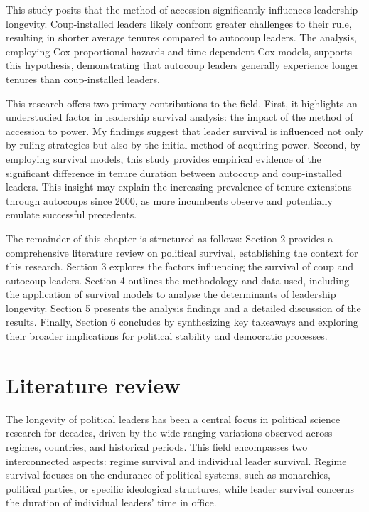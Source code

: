 \documentclass[
  12pt,
]{report}
\begin{document}
This study posits that the method of accession significantly influences
leadership longevity. Coup-installed leaders likely confront greater
challenges to their rule, resulting in shorter average tenures compared
to autocoup leaders. The analysis, employing Cox proportional hazards
and time-dependent Cox models, supports this hypothesis, demonstrating
that autocoup leaders generally experience longer tenures than
coup-installed leaders.

This research offers two primary contributions to the field. First, it
highlights an understudied factor in leadership survival analysis: the
impact of the method of accession to power. My findings suggest that
leader survival is influenced not only by ruling strategies but also by
the initial method of acquiring power. Second, by employing survival
models, this study provides empirical evidence of the significant
difference in tenure duration between autocoup and coup-installed
leaders. This insight may explain the increasing prevalence of tenure
extensions through autocoups since 2000, as more incumbents observe and
potentially emulate successful precedents.

The remainder of this chapter is structured as follows: Section 2
provides a comprehensive literature review on political survival,
establishing the context for this research. Section 3 explores the
factors influencing the survival of coup and autocoup leaders. Section 4
outlines the methodology and data used, including the application of
survival models to analyse the determinants of leadership longevity.
Section 5 presents the analysis findings and a detailed discussion of
the results. Finally, Section 6 concludes by synthesizing key takeaways
and exploring their broader implications for political stability and
democratic processes.

\section{Literature review}\label{literature-review}

The longevity of political leaders has been a central focus in political
science research for decades, driven by the wide-ranging variations
observed across regimes, countries, and historical periods. This field
encompasses two interconnected aspects: regime survival and individual
leader survival. Regime survival focuses on the endurance of political
systems, such as monarchies, political parties, or specific ideological
structures, while leader survival concerns the duration of individual
leaders' time in office.
\end{document}
